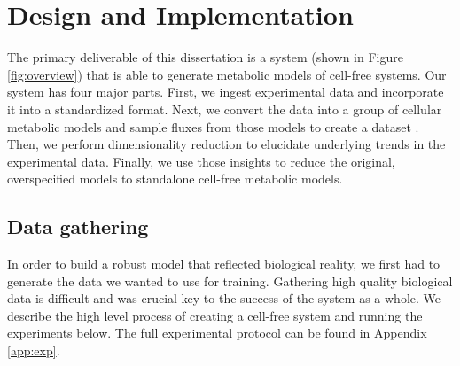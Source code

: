 \chapter{Design and Implementation} \label{chap:impl}

The primary deliverable of this dissertation is a system (shown in Figure \ref{fig:overview}) that is able to generate metabolic models of cell-free systems.
Our system has four major parts.
First, we ingest experimental data and incorporate it into a standardized format.
Next, we convert the data into a group of cellular metabolic models and sample fluxes from those models to create a dataset .
Then, we perform dimensionality reduction to elucidate underlying trends in the experimental data.
Finally, we use those insights to reduce the original, overspecified models to standalone cell-free metabolic models.

\section{Data gathering}
In order to build a robust model that reflected biological reality, we first had to generate the data we wanted to use for training.
Gathering high quality biological data is difficult and was crucial key to the success of the system as a whole.
We describe the high level process of creating a cell-free system and running the experiments below.
The full experimental protocol can be found in Appendix \ref{app:exp}.

